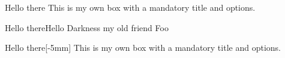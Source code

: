 \documentclass{article}
\begin{document}
\tableofcontents
\begin{mybox}[colback=yellow]{Hello there}
This is my own box with a mandatory title
and options.
\end{mybox}

\begin{myboxwithtwoparameters}{Hello there}{Hello Darkness my old friend}
Foo
\end{myboxwithtwoparameters}

\begin{mytotalbox}[colback=yellow]{Hello there}[-5mm]
This is my own box with a mandatory title
and options.
\end{mytotalbox}
\end{document}
